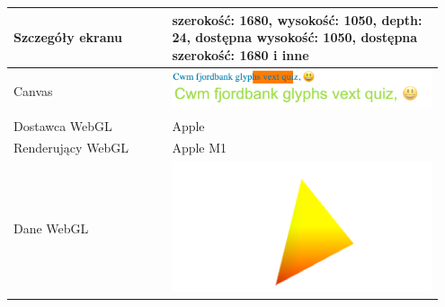 \begin{table}[p]
\begin{tabular}{|p{0.35\linewidth} | p{0.6\linewidth}|}
        Szczegóły ekranu             & szerokość: 1680, wysokość: 1050, depth: 24, dostępna wysokość: 1050, dostępna szerokość: 1680 i inne                                                                                                                                                                                                                                                                                                                                          \\ \hline
        Canvas                       & \includegraphics[width=0.9\linewidth]{img/fingerprint-cavas}                                                                                                                                                                                                                                                                                                                                                                                  \\ \hline
        Dostawca WebGL               & Apple                                                                                                                                                                                                                                                                                                                                                                                                                                         \\ \hline
        Renderujący WebGL            & Apple M1                                                                                                                                                                                                                                                                                                                                                                                                                                      \\ \hline
        Dane WebGL                   & \includegraphics[width=0.6\linewidth]{img/fingerprint-webgl}                                                                                                                                                                                                                                                                                                                                                                                  \\ \hline

\end{tabular}
\end{table}
